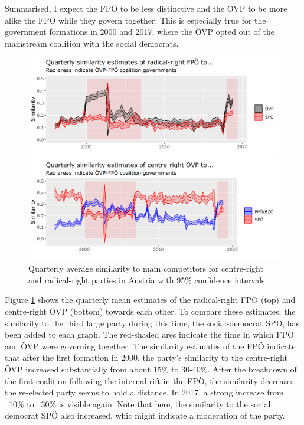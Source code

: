 \documentclass{article}
\begin{document}
Summarised, I expect the FPÖ to be less distinctive and the ÖVP to be more alike the FPÖ while they govern together. This is especially true for the government formations in 2000 and 2017, where the ÖVP opted out of the mainstream coalition with the social democrats. \par

\begin{figure}
\begin{minipage}{\textwidth}
\includegraphics[width=\linewidth]{AT/vis/AT_fp_paper.png}
\end{minipage}
\hfill
\begin{minipage}{\textwidth}
\includegraphics[width=\linewidth]{AT/vis/AT_vp_paper.png}
\end{minipage}
\caption{Quarterly average similarity to main competitors for centre-right and radical-right parties in Austria with 95\% confidence intervals.}
\label{fig:govs}
\end{figure}


Figure \ref{fig:govs} shows the quarterly mean estimates of the radical-right FPÖ (top) and centre-right ÖVP (bottom) towards each other. To compare these estimates, the similarity to the third large party during this time, the social-democrat SPD, has been added to each graph. The red-shaded ares indicate the time in which FPÖ and ÖVP were governing together. The similarity estimates of the FPÖ indicate that after the first formation in 2000, the party's similarity to the centre-right ÖVP increased substantially from about 15\% to 30-40\%. After the breakdown of the first coalition following the internal rift in the FPÖ, the similarity decreases - the re-elected party seems to hold a distance. In 2017, a strong increase from ~10\% to ~30\% is visible again. Note that here, the similarity to the social democrat SPÖ also increased, whic might indicate a moderation of the party.\par
\end{document}
